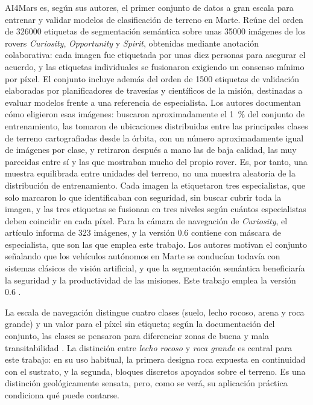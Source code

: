 AI4Mars \citep{swan2021ai4mars} es, según sus autores, el primer conjunto de datos a gran
escala para entrenar y validar modelos de clasificación de terreno en Marte. Reúne del orden
de \num{326000} etiquetas de segmentación semántica sobre unas \num{35000} imágenes de los
rovers \textit{Curiosity}, \textit{Opportunity} y \textit{Spirit}, obtenidas mediante
anotación colaborativa: cada imagen fue etiquetada por unas diez personas para asegurar el
acuerdo, y las etiquetas individuales se fusionaron exigiendo un consenso mínimo por píxel.
El conjunto incluye además del orden de \num{1500} etiquetas de validación elaboradas por
planificadores de travesías y científicos de la misión, destinadas a evaluar modelos frente a
una referencia de especialista. Los autores documentan cómo eligieron esas imágenes: buscaron
aproximadamente el \SI{1}{\percent} del conjunto de entrenamiento, las tomaron de ubicaciones
distribuidas entre las principales clases de terreno cartografiadas desde la órbita, con un
número aproximadamente igual de imágenes por clase, y retiraron después a mano las de baja
calidad, las muy parecidas entre sí y las que mostraban mucho del propio rover. Es, por tanto,
una muestra equilibrada entre unidades del terreno, no una muestra aleatoria de la distribución
de entrenamiento. Cada imagen la etiquetaron tres especialistas, que solo marcaron lo que
identificaban con seguridad, sin buscar cubrir toda la imagen, y las tres etiquetas se fusionan
en tres niveles según cuántos especialistas deben coincidir en cada píxel. Para la cámara de
navegación de \textit{Curiosity}, el artículo informa de 323 imágenes, y la versión 0.6 contiene
\cNGold{} con máscara de especialista, que son las que emplea este trabajo. Los autores motivan el conjunto señalando que los vehículos
autónomos en Marte se conducían todavía con sistemas clásicos de visión artificial, y que la
segmentación semántica beneficiaría la seguridad y la productividad de las misiones. Este
trabajo emplea la versión 0.6 \citep{swan2022ai4marsdata}.

La escala de navegación distingue cuatro clases (suelo, lecho rocoso, arena y roca grande) y
un valor para el píxel sin etiqueta; según la documentación del conjunto, las clases se
pensaron para diferenciar zonas de buena y mala transitabilidad \citep{swan2022ai4marsdata}. La
distinción entre \textit{lecho rocoso} y \textit{roca grande} es central para este trabajo: en
su uso habitual, la primera designa roca expuesta en continuidad con el sustrato, y la segunda,
bloques discretos apoyados sobre el terreno. Es una distinción
geológicamente sensata, pero, como se verá, su aplicación práctica condiciona qué puede
contarse.

